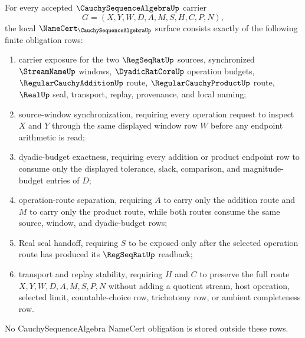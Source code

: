 \begin{theorem}
\label{thm:cauchy-sequence-algebra-namecert-obligations}
For every accepted $\CauchySequenceAlgebraUp$ carrier
$$
G=(X,Y,W,D,A,M,S,H,C,P,N),
$$
the local $\NameCert_{\CauchySequenceAlgebraUp}$ surface consists exactly of the following finite obligation rows:
\begin{enumerate}
\item carrier exposure for the two $\RegSeqRatUp$ sources, synchronized $\StreamNameUp$ windows, $\DyadicRatCoreUp$ operation budgets, $\RegularCauchyAdditionUp$ route, $\RegularCauchyProductUp$ route, $\RealUp$ seal, transport, replay, provenance, and local naming;
\item source-window synchronization, requiring every operation request to inspect $X$ and $Y$ through the same displayed window row $W$ before any endpoint arithmetic is read;
\item dyadic-budget exactness, requiring every addition or product endpoint row to consume only the displayed tolerance, slack, comparison, and magnitude-budget entries of $D$;
\item operation-route separation, requiring $A$ to carry only the addition route and $M$ to carry only the product route, while both routes consume the same source, window, and dyadic-budget rows;
\item Real seal handoff, requiring $S$ to be exposed only after the selected operation route has produced its $\RegSeqRatUp$ readback;
\item transport and replay stability, requiring $H$ and $C$ to preserve the full route $X,Y,W,D,A,M,S,P,N$ without adding a quotient stream, host operation, selected limit, countable-choice row, trichotomy row, or ambient completeness row.
\end{enumerate}
No CauchySequenceAlgebra NameCert obligation is stored outside these rows.
\end{theorem}
